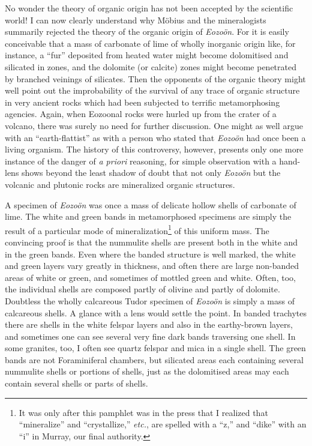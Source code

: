 \documentclass[a4paper, 12pt, oneside]{article}
\begin{document}
No wonder the theory of organic origin has not been accepted by the scientific world! I can now clearly understand why Möbius and the mineralogists summarily rejected the theory of the organic origin of \emph{Eozoön}. For it is easily conceivable that a mass of carbonate of lime of wholly inorganic origin like, for instance, a ``fur'' deposited from heated water might become dolomitised and silicated in zones, and the dolomite (or calcite) zones might become penetrated by branched veinings of silicates. Then the opponents of the organic theory might well point out the improbability of the survival of any trace of organic structure in very ancient rocks which had been subjected to terrific metamorphosing agencies. Again, when Eozoonal rocks were hurled up from the crater of a volcano, there was surely no need for further discussion. One might as well argue with an ``earth-flattist'' as with a person who stated that \emph{Eozoön} had once been a living organism. The history of this controversy, however, presents only one more instance of the danger of \emph{a priori} reasoning, for simple observation with a hand-lens shows beyond the least shadow of doubt that not only \emph{Eozoön} but the volcanic and plutonic rocks are mineralized organic structures.

A specimen of \emph{Eozoön} was once a mass of delicate hollow shells of carbonate of lime. The white and green bands in metamorphosed specimens are simply the result of a particular mode of mineralization\footnote{It was only after this pamphlet was in the press that I realized that ``mineralize'' and ``crystallize,'' \emph{etc.}, are spelled with a ``z,'' and ``dike'' with an ``i'' in Murray, our final authority.} of this uniform mass. The convincing proof is that the nummulite shells are present both in the white and in the green bands. Even where the banded structure is well marked, the white and green layers vary greatly in thickness, and often there are large non-banded areas of white or green, and sometimes of mottled green and white. Often, too, the individual shells are composed partly of olivine and partly of dolomite. Doubtless the wholly calcareous Tudor specimen of \emph{Eozoön} is simply a mass of calcareous shells. A glance with a lens would settle the point. In banded trachytes there are shells in the white felspar layers and also in the earthy-brown layers, and sometimes one can see several very fine dark bands traversing one shell. In some granites, too, I often see quartz felspar and mica in a single shell. The green bands are not Foraminiferal chambers, but silicated areas each containing several nummulite shells or portions of shells, just as the dolomitised areas may each contain several shells or parts of shells.
\end{document}
